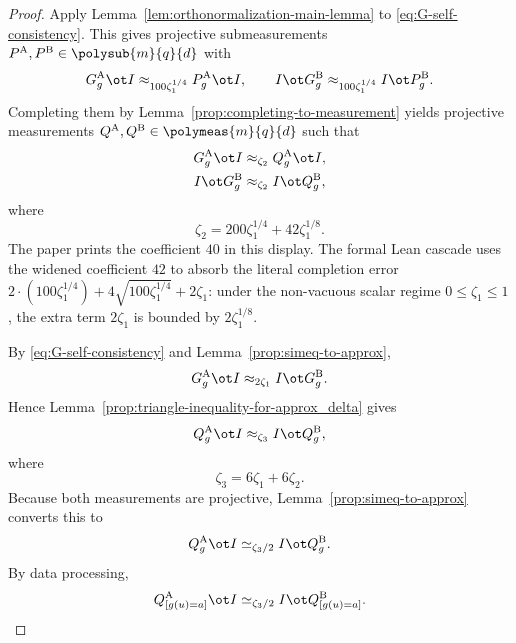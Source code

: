 \begin{proof}
	Apply Lemma~\ref{lem:orthonormalization-main-lemma} to \ref{eq:G-self-consistency}. This gives projective submeasurements $P^{\mathrm A},P^{\mathrm B} \in \polysub{m}{q}{d}$ with
	\[
		G_g^{\mathrm A} \ot I \approx_{100\zeta_1^{1/4}} P_g^{\mathrm A} \ot I,
		\qquad
		I \ot G_g^{\mathrm B} \approx_{100\zeta_1^{1/4}} I \ot P_g^{\mathrm B}.
	\]
	Completing them by Lemma~\ref{prop:completing-to-measurement} yields projective measurements $Q^{\mathrm A},Q^{\mathrm B} \in \polymeas{m}{q}{d}$ such that
	\begin{align}
		G_g^{\mathrm A} \ot I & \approx_{\zeta_2} Q_g^{\mathrm A} \ot I, \label{eq:G-with-Q-A} \\
		I \ot G_g^{\mathrm B} & \approx_{\zeta_2} I \ot Q_g^{\mathrm B}, \notag
	\end{align}
	where
	\[
		\zeta_2 = 200\zeta_1^{1/4} + 42\zeta_1^{1/8}.
	\]
	The paper prints the coefficient $40$ in this display.  The formal Lean
	cascade uses the widened coefficient $42$ to absorb the literal completion
	error $2\cdot(100\zeta_1^{1/4})+4\sqrt{100\zeta_1^{1/4}}+2\zeta_1$:
	under the non-vacuous scalar regime $0 \le \zeta_1 \le 1$, the extra term
	$2\zeta_1$ is bounded by $2\zeta_1^{1/8}$.

	By \ref{eq:G-self-consistency} and Lemma~\ref{prop:simeq-to-approx},
	\[
		G_g^{\mathrm A} \ot I \approx_{2\zeta_1} I \ot G_g^{\mathrm B}.
	\]
	Hence Lemma~\ref{prop:triangle-inequality-for-approx_delta} gives
	\[
		Q_g^{\mathrm A} \ot I \approx_{\zeta_3} I \ot Q_g^{\mathrm B},
	\]
	where
	\[
		\zeta_3 = 6\zeta_1 + 6\zeta_2.
	\]
	Because both measurements are projective, Lemma~\ref{prop:simeq-to-approx} converts this to
	\begin{equation}\label{eq:completed-polynomial-consistency}
		Q_g^{\mathrm A} \ot I \simeq_{\zeta_3/2} I \ot Q_g^{\mathrm B}.
	\end{equation}
	By data processing,
	\begin{equation}\label{eq:point-evaluation-data-processing}
		Q_{[g(u)=a]}^{\mathrm A} \ot I \simeq_{\zeta_3/2} I \ot Q_{[g(u)=a]}^{\mathrm B}.
	\end{equation}


\end{proof}
